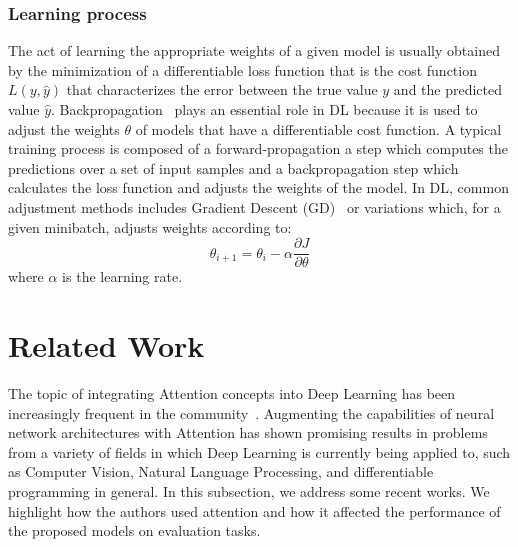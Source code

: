 \documentclass[12pt]{article}
\begin{document}
\subsubsection{Learning process}
The act of learning the appropriate weights of a given model
is usually obtained by the minimization of a differentiable loss function
that is the cost function $L(y, \hat{y})$ that characterizes the error
between the true value $y$ and the predicted value $\hat{y}$.
Backpropagation~\cite{ref:backprop} plays an essential role in DL because it is used to adjust the weights $\theta$ of models that have a
differentiable cost function.
A typical training process is composed of a forward-propagation
a step which computes the predictions over a set of input samples
and a backpropagation step which calculates the loss function
and adjusts the weights of the model.
In DL, common adjustment methods includes Gradient Descent (GD)~\cite{ref:gd} or variations
which, for a given minibatch, adjusts weights according to:
$$\theta_{i+1} = \theta_i - \alpha\frac{\partial{J}}{\partial{\theta}}$$
where $\alpha$ is the learning rate.

\vspace{2cm}
\section{Related Work} \label{sess:related-work}
The topic of integrating Attention concepts into Deep Learning has been increasingly frequent
in the community~\cite{ref:att-survey}.
Augmenting the capabilities of neural network architectures with Attention has shown promising results
in problems from a variety of fields in which Deep Learning is currently being applied to, such as
Computer Vision, Natural Language Processing, and differentiable programming in general.
In this subsection, we address some recent works.
We highlight how the authors used attention and how it affected the performance of the proposed models
on evaluation tasks.
\end{document}
